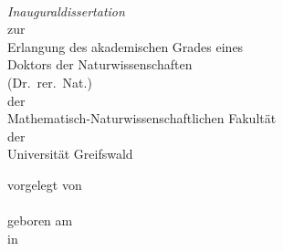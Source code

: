 \begin{titlepage}
    \begin{center}
        \huge\textbf{}\\
        \vspace{0.8cm}
        {\huge\itshape Inauguraldissertation}\\
        \vspace{0.8cm}
        {\Large zur\\
        \vspace{0.25cm}
        Erlangung des akademischen Grades eines\\
        Doktors der Naturwissenschaften\\
        (Dr.\ rer.\ Nat.)\\
        \vspace{0.25cm}
        der\\
        \vspace{0.25cm}
        Mathematisch-Naturwissenschaftlichen Fakultät\\
        \vspace{0.25cm}
        der\\
        \vspace{0.25cm}
        Universität Greifswald\\
        }
        \vspace{1cm}
    \end{center}
    \vspace*{\fill}%

    \begin{minipage}[]{0.66\linewidth}
        \hfill\vspace{0.1cm}
    \end{minipage}
    \begin{minipage}[]{0.33\linewidth}
        \begin{flushleft}
            vorgelegt von \\
            \\%
            geboren am \\%
            in \\%
        \end{flushleft}
    \end{minipage}
    \vspace{0.5cm}%


\end{titlepage}
